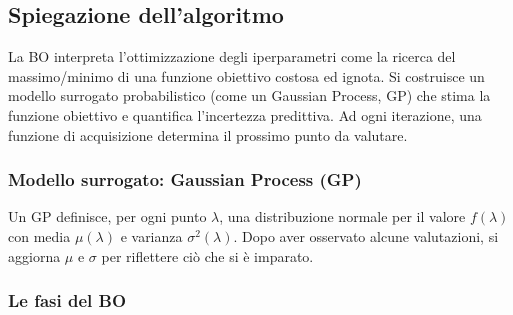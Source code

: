 \documentclass[a4paper,12pt]{report}
\begin{document}
	\subsection{Spiegazione dell'algoritmo}
	La BO interpreta l’ottimizzazione degli iperparametri come la ricerca del massimo/minimo di una funzione obiettivo costosa ed ignota. Si costruisce un modello surrogato probabilistico (come un Gaussian Process, GP) che stima la funzione obiettivo e quantifica l’incertezza predittiva. Ad ogni iterazione, una funzione di acquisizione determina il prossimo punto da valutare.
	
	\subsubsection{Modello surrogato: Gaussian Process (GP)}
	Un GP definisce, per ogni punto $\lambda$, una distribuzione normale per il valore $f(\lambda)$ con media $\mu(\lambda)$ e varianza $\sigma^2(\lambda)$. Dopo aver osservato alcune valutazioni, si aggiorna $\mu$ e $\sigma$ per riflettere ciò che si è imparato.
	
	\subsubsection{Le fasi del BO}
	
\end{document}
